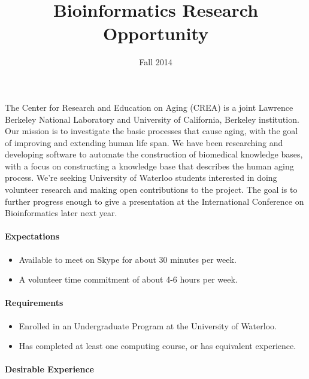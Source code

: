 \documentclass[10pt, a4paper, notitlepage]{article}
\begin{document}
\title{Bioinformatics Research Opportunity}
\date{\vspace{-0.75cm}Fall 2014}
\maketitle

\paragraph{} %

The Center for Research and Education on Aging (CREA) is a joint Lawrence
Berkeley National Laboratory and University of California, Berkeley institution.
Our mission is to investigate the basic processes that cause aging, with the
goal of improving and extending human life span.
We have been researching and developing software to automate the construction of biomedical knowledge bases,
with a focus on constructing a knowledge base that describes the human aging process.
We're seeking University of Waterloo students interested in doing volunteer research and  making open
contributions to the project. The goal is to further progress enough to give a presentation at
the International Conference on Bioinformatics later next year.

\paragraph{Expectations}

\begin{itemize}
\item Available to meet on Skype for about 30 minutes per week.
\item A volunteer time commitment of about 4-6 hours per week.
\end{itemize}

\paragraph{Requirements}

\begin{itemize}
\item Enrolled in an Undergraduate Program at the University of Waterloo.
\item Has completed at least one computing course, or has equivalent experience.

\end{itemize}

\paragraph{Desirable Experience}
\end{document}
